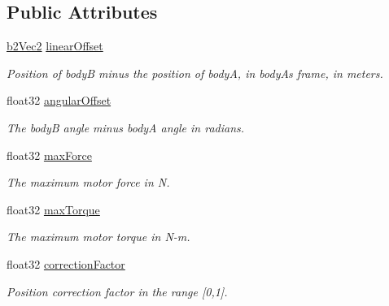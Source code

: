 \subsection*{Public Attributes}
\begin{DoxyCompactItemize}
\item 
\hyperlink{structb2_vec2}{b2\+Vec2} \hyperlink{structb2_motor_joint_def_a2c957cffc2af66c6c8077c069b906bc4}{linear\+Offset}\hypertarget{structb2_motor_joint_def_a2c957cffc2af66c6c8077c069b906bc4}{}\label{structb2_motor_joint_def_a2c957cffc2af66c6c8077c069b906bc4}

\begin{DoxyCompactList}\small\item\em Position of bodyB minus the position of bodyA, in bodyA\textquotesingle{}s frame, in meters. \end{DoxyCompactList}\item 
float32 \hyperlink{structb2_motor_joint_def_abdb42eff4aeff1d48038e084c57e1cb0}{angular\+Offset}\hypertarget{structb2_motor_joint_def_abdb42eff4aeff1d48038e084c57e1cb0}{}\label{structb2_motor_joint_def_abdb42eff4aeff1d48038e084c57e1cb0}

\begin{DoxyCompactList}\small\item\em The bodyB angle minus bodyA angle in radians. \end{DoxyCompactList}\item 
float32 \hyperlink{structb2_motor_joint_def_a2f66d1b99c654e112dc68e15375d5ee7}{max\+Force}\hypertarget{structb2_motor_joint_def_a2f66d1b99c654e112dc68e15375d5ee7}{}\label{structb2_motor_joint_def_a2f66d1b99c654e112dc68e15375d5ee7}

\begin{DoxyCompactList}\small\item\em The maximum motor force in N. \end{DoxyCompactList}\item 
float32 \hyperlink{structb2_motor_joint_def_afcf5dd58166917a4574d1f28f6bb3660}{max\+Torque}\hypertarget{structb2_motor_joint_def_afcf5dd58166917a4574d1f28f6bb3660}{}\label{structb2_motor_joint_def_afcf5dd58166917a4574d1f28f6bb3660}

\begin{DoxyCompactList}\small\item\em The maximum motor torque in N-\/m. \end{DoxyCompactList}\item 
float32 \hyperlink{structb2_motor_joint_def_ab282afdb92d07ead23530f57fd0eb9ea}{correction\+Factor}\hypertarget{structb2_motor_joint_def_ab282afdb92d07ead23530f57fd0eb9ea}{}\label{structb2_motor_joint_def_ab282afdb92d07ead23530f57fd0eb9ea}

\begin{DoxyCompactList}\small\item\em Position correction factor in the range \mbox{[}0,1\mbox{]}. \end{DoxyCompactList}\end{DoxyCompactItemize}


